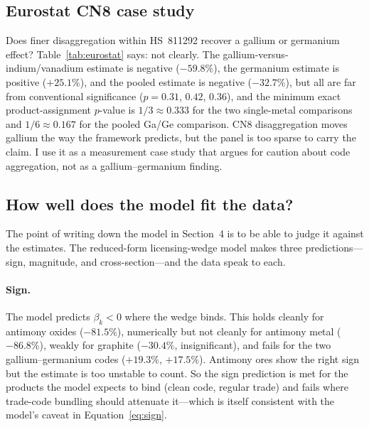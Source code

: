 \documentclass[12pt,a4paper]{article}
\begin{document}
\subsection{Eurostat CN8 case study}\label{sec:eurostat}

Does finer disaggregation within HS~811292 recover a gallium or germanium effect?
Table~\ref{tab:eurostat} says: not clearly. The gallium-versus-indium/vanadium
estimate is negative ($-59.8\%$), the germanium estimate is positive ($+25.1\%$),
and the pooled estimate is negative ($-32.7\%$), but all are far from
conventional significance ($p=0.31$, $0.42$, $0.36$), and the minimum exact
product-assignment $p$-value is $1/3\approx 0.333$ for the two single-metal
comparisons and $1/6\approx 0.167$ for the pooled Ga/Ge comparison. CN8 disaggregation moves gallium the way the
framework predicts, but the panel is too sparse to carry the claim. I use it as a
measurement case study that argues for caution about code aggregation, not as a
gallium--germanium finding.



\subsection{How well does the model fit the data?}\label{sec:reading}

The point of writing down the model in Section~4 is to be able to judge it
against the estimates. The reduced-form licensing-wedge model makes three
predictions---sign, magnitude, and cross-section---and the data speak to each.

\paragraph{Sign.} The model predicts $\beta_k<0$ where the wedge binds. This
holds cleanly for antimony oxides ($-81.5\%$), numerically but not cleanly for
antimony metal ($-86.8\%$),
weakly for graphite ($-30.4\%$, insignificant), and fails for the two
gallium--germanium codes ($+19.3\%$, $+17.5\%$). Antimony ores show the right
sign but the estimate is too unstable to count. So the sign prediction is met
for the products the model expects to bind (clean code, regular trade) and fails
where trade-code bundling should attenuate it---which is itself consistent with
the model's caveat in Equation~\eqref{eq:sign}.
\end{document}
